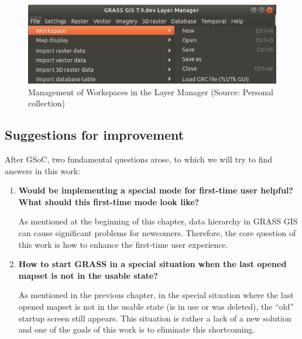\documentclass[a4paper,10pt,twoside]{article}
\begin{document}
\vspace{0.3cm}
\begin{figure}[hbt!] 
\begin{center}
\includegraphics[width=14cm]{../pictures/workspace_grass.png} 
\caption[Management of Workspaces in the Layer Manager]{Management of Workspaces in the Layer Manager (Source: Personal collection)}
\label{fig:workspace_grass}
\end{center}
\end{figure}


\newpage
\vspace*{-1cm}
\subsection{Suggestions for improvement}

After GSoC, two fundamental questions arose, to which we will try to find answers in this work:

\begin{enumerate}

\item  \noindent \textbf{Would be implementing a special mode for first-time user helpful? What should this first-time mode look like?}

\noindent As mentioned at the beginning of this chapter, data hierarchy in GRASS GIS can cause significant problems for newcomers. Therefore, the core question of this work is how to enhance the first-time user experience.

\item \noindent \textbf{How to start GRASS in a special situation when the last opened mapset is not in the usable state?}

As mentioned in the previous chapter, in the special situation where the last opened mapset is not in the usable state (is in use or was deleted), the ``old'' startup screen still appears. This situation is rather a lack of a new solution and one of the goals of this work is to eliminate this shortcoming. 

\end{enumerate}
\end{document}
